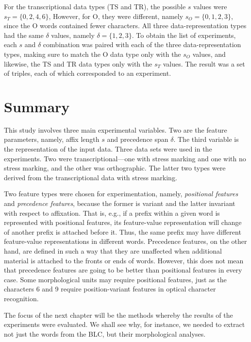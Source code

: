 For the transcriptional data types (TS and TR), the possible $s$ values were $s_T = \{0,2,4,6\}$, However, for O, they were different, namely $s_O = \{0,1,2,3\}$, since the O words contained fewer characters. All three data-representation types had the  same $\delta$ values, namely $\delta = \{1,2,3\}$. %
To obtain the list of experiments, each $s$ and $\delta$ combination was paired with each of the three data-representation types, making sure to match the O data type only with the $s_O$ values, and likewise, the TS and TR data types only with the $s_T$ values. The result was a set of triples, each of which corresponded to an experiment. 


\section{Summary}

This study involves three main experimental variables. Two are the feature parameters, namely, affix length $s$ and precedence span $\delta$. The third variable is the representation of the input data. Three data sets were used in the experiments. Two were transcriptional---one with stress marking and one with no stress marking, and the other was orthographic. The latter two types were derived from the transcriptional data with stress marking. 

Two feature types were chosen for experimentation, namely, \emph{positional features} and \emph{precedence features},
because the former is variant and the latter invariant with respect to affixation. That is, e.g., if a prefix within a given word is represented with positional features, its feature-value representation will change of another prefix is attached before it. Thus, the same prefix may have different feature-value representations in different words. Precedence features, on the other hand, are defined in such a way that they are unaffected when additional material is attached to the fronts or ends of words. However, this does not mean that precedence features are going to be better than positional features in every case. Some morphological units may require positional features, just as the characters 6 and 9 require position-variant features in optical character recognition. 

The focus of the next chapter will be the methods whereby the results of the experiments were evaluated. We shall see why, for instance, we needed to extract not just the words from the \ac{BLC}, but their morphological analyses. 